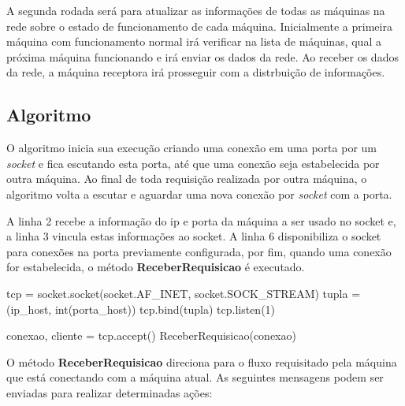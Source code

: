 A segunda rodada será para atualizar as informações de todas as máquinas na rede sobre o estado de funcionamento de cada máquina. Inicialmente a primeira máquina com funcionamento normal 
irá verificar na lista de máquinas, qual a próxima máquina funcionando e irá enviar os dados da rede. Ao receber os dados da rede, a máquina receptora irá prosseguir com a distrbuição 
de informações.

\subsection{Algoritmo}
\label{sub:adaptiveDSD_Algoritmo}
O algoritmo \adaptive inicia sua execução criando uma conexão em uma porta por um \textit{socket} e fica escutando esta porta, até que uma conexão seja estabelecida por outra máquina.
Ao final de toda requisição realizada por outra máquina, o algoritmo volta a escutar e aguardar uma nova conexão por \textit{socket} com a porta.

A linha 2 recebe a informação do ip e porta da máquina a ser usado no socket e, a linha 3 vincula estas informações ao socket. A linha 6 disponibiliza o socket para conexões na porta previamente
configurada, por fim, quando uma conexão for estabelecida, o método \textbf{ReceberRequisicao} é executado.

\vspace*{1cm}
\begin{python}
    tcp = socket.socket(socket.AF_INET, socket.SOCK_STREAM)
    tupla = (ip_host, int(porta_host))
    tcp.bind(tupla)
    tcp.listen(1)

    conexao, cliente = tcp.accept() 
    ReceberRequisicao(conexao)
\end{python}
\vspace*{1cm}

O método \textbf{ReceberRequisicao} direciona para o fluxo requisitado pela máquina que está conectando com a máquina atual. As seguintes mensagens podem ser enviadas para realizar determinadas ações:

